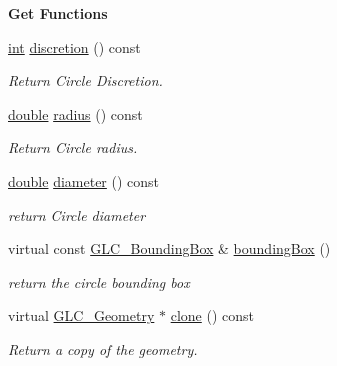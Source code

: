 \begin{Indent}{\bf Get Functions}\par
\begin{DoxyCompactItemize}
\item 
\hyperlink{ioapi_8h_a787fa3cf048117ba7123753c1e74fcd6}{int} \hyperlink{class_g_l_c___circle_a626be6f6246a456753b111e7bf337afd}{discretion} () const 
\begin{DoxyCompactList}\small\item\em Return Circle Discretion. \end{DoxyCompactList}\item 
\hyperlink{_super_l_u_support_8h_a8956b2b9f49bf918deed98379d159ca7}{double} \hyperlink{class_g_l_c___circle_a17c58dbf23bde7cd6d1e50df2d4d4386}{radius} () const 
\begin{DoxyCompactList}\small\item\em Return Circle radius. \end{DoxyCompactList}\item 
\hyperlink{_super_l_u_support_8h_a8956b2b9f49bf918deed98379d159ca7}{double} \hyperlink{class_g_l_c___circle_a4460b829d92f267d1b8c95765f1945ee}{diameter} () const 
\begin{DoxyCompactList}\small\item\em return Circle diameter \end{DoxyCompactList}\item 
virtual const \hyperlink{class_g_l_c___bounding_box}{G\-L\-C\-\_\-\-Bounding\-Box} \& \hyperlink{class_g_l_c___circle_aa95c0e281005d2fed79bbe290a7d4dca}{bounding\-Box} ()
\begin{DoxyCompactList}\small\item\em return the circle bounding box \end{DoxyCompactList}\item 
virtual \hyperlink{class_g_l_c___geometry}{G\-L\-C\-\_\-\-Geometry} $\ast$ \hyperlink{class_g_l_c___circle_a6a5ed068a6ac235ef6f88534ae141e94}{clone} () const 
\begin{DoxyCompactList}\small\item\em Return a copy of the geometry. \end{DoxyCompactList}\end{DoxyCompactItemize}
\end{Indent}
